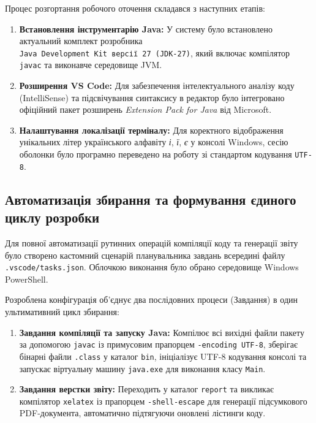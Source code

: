 Процес розгортання робочого оточення складався з наступних етапів:
\begin{enumerate}
    \item \textbf{Встановлення інструментарію Java:} 
    У систему було встановлено актуальний комплект розробника\\
     \texttt{Java Development Kit версії 27 (JDK-27)},
    який включає компілятор \texttt{javac} та виконавче середовище JVM.
    \item \textbf{Розширення VS Code:} 
    Для забезпечення інтелектуального аналізу коду (IntelliSense) та підсвічування синтаксису 
    в редактор було інтегровано офіційний пакет розширень \textit{Extension Pack for Java} від Microsoft.
    \item \textbf{Налаштування локалізації терміналу:} Для коректного відображення унікальних літер 
    українського алфавіту \textit{і}, \textit{ї}, \textit{є} у консолі Windows, сесію оболонки 
    було програмно переведено на роботу зі стандартом кодування \texttt{UTF-8}.
\end{enumerate}

\subsection{Автоматизація збирання та формування єдиного циклу розробки}

Для повної автоматизації рутинних операцій компіляції коду та генерації звіту було створено 
кастомний сценарій планувальника завдань всередині файлу \texttt{.vscode/tasks.json}. Облочкою виконання 
було обрано середовище Windows PowerShell.

Розроблена конфігурація об'єднує два послідовних процеси (Завдання) в один ультимативний цикл збирання:
\begin{enumerate}
    \item \textbf{Завдання компіляції та запуску Java:} 
    Компілює всі вихідні файли пакету за допомогою \texttt{javac} із примусовим прапорцем \texttt{-encoding UTF-8}, 
    зберігає бінарні файли \texttt{.class} у каталог \texttt{bin}, ініціалізує UTF-8 кодування консолі та запускає 
    віртуальну машину \texttt{java.exe} для виконання класу \texttt{Main}.
    \item \textbf{Завдання верстки звіту:} Переходить у каталог \texttt{report} та викликає компілятор \texttt{xelatex} 
    із прапорцем \texttt{-shell-escape} для генерації підсумкового PDF-документа, автоматично підтягуючи оновлені 
    лістинги коду.
\end{enumerate}

